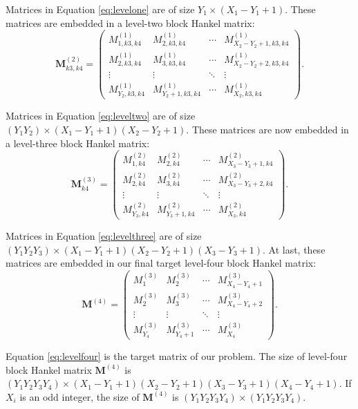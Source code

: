 Matrices in Equation \ref{eq:levelone} are of size $Y_1 \times (X_1-Y_1+1)$. These matrices are embedded in a level-two block Hankel matrix:
\begin{equation}
\label{eq:leveltwo}
\mathbf{M}_{k3,k4}^{(2)}=\left(\begin{array}{cccc}
M_{1,k3,k4}^{(1)} & M_{2,k3,k4}^{(1)} & \cdots &M_{X_2-Y_2+1,k3,k4}^{(1)} \\
M_{2,k3,k4}^{(1)} & M_{3,k3,k4}^{(1)}  &\cdots &M_{X_2-Y_2+2,k3,k4}^{(1)} \\
\vdots & \vdots &\ddots &\vdots \\
M_{Y_2,k3,k4}^{(1)}&M_{Y_2+1,k3,k4}^{(1)} &\cdots&M_{X_2,k3,k4}^{(1)}
\end{array}
\right).
\end{equation}

Matrices in Equation \ref{eq:leveltwo} are of size $(Y_1 Y_2) \times (X_1-Y_1+1)(X_2-Y_2+1)$. These matrices are now embedded in a level-three block Hankel matrix:
\begin{equation}
\label{eq:levelthree}
\mathbf{M}_{k4}^{(3)}=\left(\begin{array}{cccc}
M_{1,k4}^{(2)} & M_{2,k4}^{(2)} & \cdots &M_{X_3-Y_3+1,k4}^{(2)} \\
M_{2,k4}^{(2)} & M_{3,k4}^{(2)}  &\cdots &M_{X_3-Y_3+2,k4}^{(2)} \\
\vdots & \vdots &\ddots &\vdots \\
M_{Y_3,k4}^{(2)}&M_{Y_3+1,k4}^{(2)} &\cdots&M_{X_3,k4}^{(2)}
\end{array}
\right).
\end{equation}

Matrices in Equation \ref{eq:levelthree} are of size $(Y_1 Y_2 Y_3) \times (X_1-Y_1+1)(X_2-Y_2+1)(X_3-Y_3+1)$. At last, these matrices are embedded in our final target level-four block Hankel matrix:
\begin{equation}
\label{eq:levelfour}
\mathbf{M}^{(4)}=\left(\begin{array}{cccc}
M_{1}^{(3)} & M_{2}^{(3)} & \cdots &M_{X_4-Y_4+1}^{(3)} \\
M_{2}^{(3)} & M_{3}^{(3)}  &\cdots &M_{X_4-Y_4+2}^{(3)} \\
\vdots & \vdots &\ddots &\vdots \\
M_{Y_4}^{(3)}&M_{Y_4+1}^{(3)} &\cdots&M_{X_4}^{(3)}
\end{array}
\right).
\end{equation}

Equation \ref{eq:levelfour} is the target matrix of our problem. The size of level-four block Hankel matrix $\mathbf{M}^{(4)}$ is $(Y_1 Y_2 Y_3 Y_4) \times (X_1-Y_1+1)(X_2-Y_2+1)(X_3-Y_3+1)(X_4-Y_4+1)$. If $X_i$ is an odd integer, the size of $\mathbf{M}^{(4)}$ is $(Y_1 Y_2 Y_3 Y_4) \times(Y_1 Y_2 Y_3 Y_4) $.

